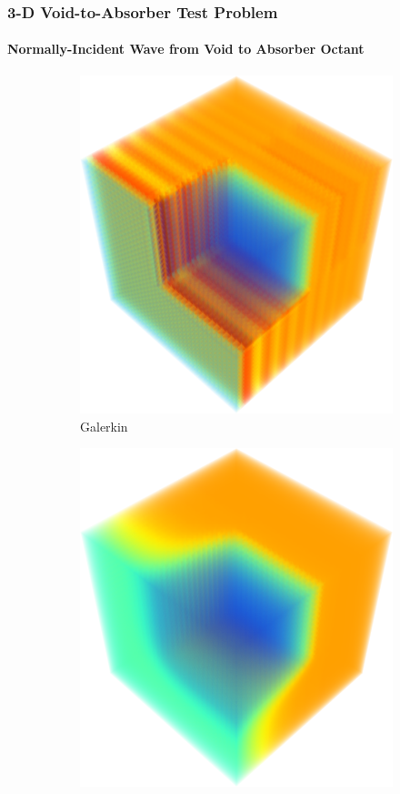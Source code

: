 \begin{frame}
\frametitle{3-D Void-to-Absorber Test Problem}
\framesubtitle{Normally-Incident Wave from Void to Absorber Octant}

\begin{figure}[h]
   \centering
   \begin{subfigure}{0.45\textwidth}
      \centering
      \includegraphics[width=\textwidth]{./figures/Gal_3D.png}
      \caption{Galerkin}
   \end{subfigure}
   \begin{subfigure}{0.45\textwidth}
      \centering
      \includegraphics[width=\textwidth]{./figures/GalFCT_3D.png}

\end{subfigure}
\end{figure}
\end{frame}
